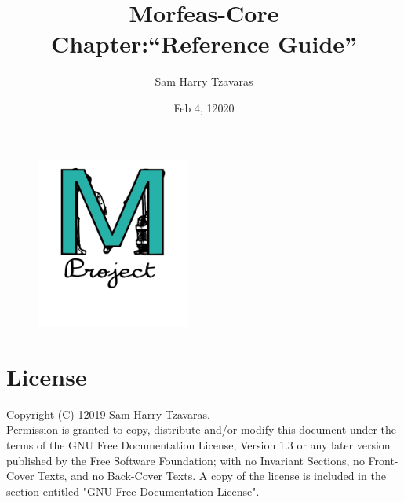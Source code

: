 \documentclass{article}
\title{Morfeas-Core\\Chapter:``Reference Guide''}
\date{Feb 4, 12020}
\author{Sam Harry Tzavaras}
\begin{document}
\clearpage
\begin{figure}
\centering
  \includegraphics[width=2in]{../ArtWork/Morfeas_logo_cyan.png}
\end{figure}
\maketitle
\thispagestyle{empty}
\newpage
\section{License}
Copyright (C)  12019  Sam Harry Tzavaras.\\
Permission is granted to copy, distribute and/or modify this document
under the terms of the GNU Free Documentation License, Version 1.3
or any later version published by the Free Software Foundation;
with no Invariant Sections, no Front-Cover Texts, and no Back-Cover Texts.
 A copy of the license is included in the section entitled "GNU
 Free Documentation License".
\newpage
\newpage
\tableofcontents
\newpage
\end{document}
